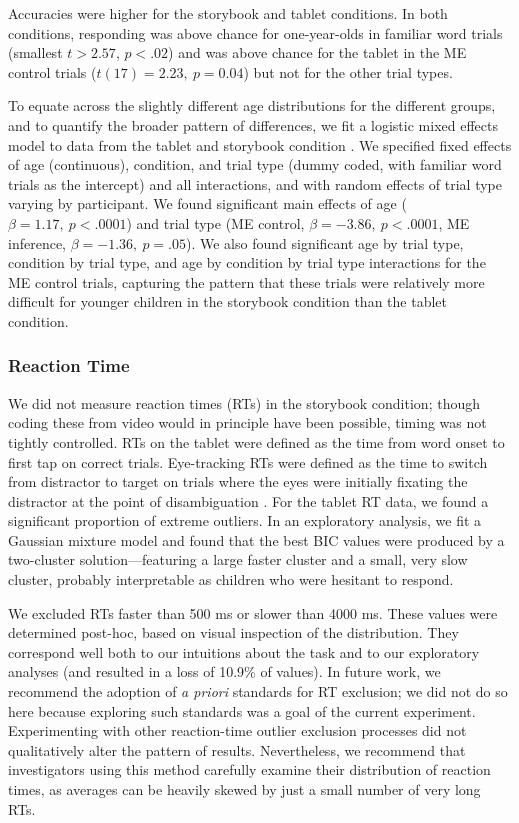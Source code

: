 \documentclass[man,noapacite]{apa2}
\begin{document}
Accuracies were higher for the storybook and tablet conditions. In both conditions, responding was above chance for one-year-olds in familiar word trials (smallest $t > 2.57$, $p < .02$) and was above chance for the tablet in the ME control trials ($t(17) = 2.23,~p = 0.04$) but not for the other trial types. 

To equate across the slightly different age distributions for the different groups, and to quantify the broader pattern of differences, we fit a logistic mixed effects model to data from the tablet and storybook condition \cite{jaeger2008}. We specified fixed effects of age (continuous), condition, and trial type (dummy coded, with familiar word trials as the intercept) and all interactions, and with random effects of trial type varying by participant. We found significant main effects of age ($\beta = 1.17,~p < .0001$) and trial type (ME control, $\beta = -3.86,~p <.0001$, ME inference, $\beta = -1.36,~p = .05$). We also found significant age by trial type, condition by trial type, and age by condition by trial type interactions for the ME control trials, capturing the pattern that these trials were relatively more difficult for younger children in the storybook condition than the tablet condition.

\subsubsection{Reaction Time}

We did not measure reaction times (RTs) in the storybook condition; though coding these from video would in principle have been possible, timing was not tightly controlled. RTs on the tablet were defined as the time from word onset to first tap on correct trials. Eye-tracking RTs were defined as the time to switch from distractor to target on trials where the eyes were initially fixating the distractor at the point of disambiguation \cite<for more details, see>{fernald2008}. For the tablet RT data, we found a significant proportion of extreme outliers. In an exploratory analysis, we fit a Gaussian mixture model and found that the best BIC values were produced by a two-cluster solution---featuring a large faster cluster and a small, very slow cluster, probably interpretable as children who were hesitant to respond.

We excluded RTs faster than 500 ms or slower than 4000 ms. These values were determined post-hoc, based on visual inspection of the distribution. They correspond well both to our intuitions about the task and to our exploratory analyses (and resulted in a loss of 10.9\% of values). In future work, we recommend the adoption of {\it a priori} standards for RT exclusion; we did not do so here because exploring such standards was a goal of the current experiment. Experimenting with other reaction-time outlier exclusion processes did not qualitatively alter the pattern of results. Nevertheless, we recommend that investigators using this method carefully examine their distribution of reaction times, as averages can be heavily skewed by just a small number of very long RTs.
\end{document}
